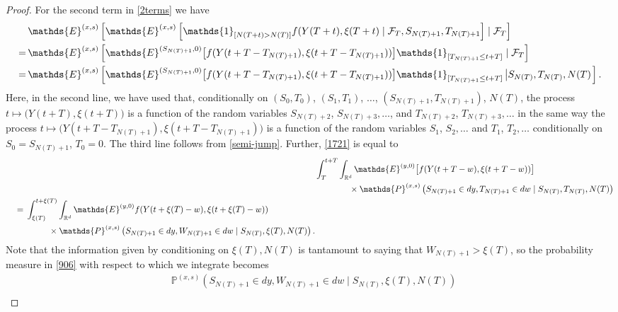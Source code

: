 \documentclass[reqno]{amsart}
\theoremstyle{remark}
\numberwithin{equation}{section} %
\newcommand{\1}{\mathds{1}}
\begin{document}
\begin{proof}
		For the second term in \eqref{2terms} we have
		\begin{align}
			&  \mathds{E}^{(x,s)}\left[\mathds{E}^{(x,s)} \left[ \1_{[N(T+t) > N(T)]}f(Y(T+t), \xi(T+t) \mid \mathcal{F}_T, S_{N(T)+1}, T_{N(T)+1} \right] \mid \mathcal{F}_T \right] \notag \\
			= \, & \mathds{E}^{(x,s)} \left[ \mathds{E}^{(S_{N(T)+1},0)} \big[f(Y( t+T-T_{N(T)+1}), \xi(t+T-T_{N(T)+1}))\big] \mathds{1}_{[T_{N(T)+1}\leq t+T]} \mid \mathcal{F}_T \right]\notag \\
			= \, & \mathds{E}^{(x,s)} \left[ \mathds{E}^{(S_{N(T)+1},0)} \big[f(Y( t+T-T_{N(T)+1}), \xi(t+T-T_{N(T)+1}))\big] \mathds{1}_{[T_{N(T)+1}\leq t+T]} \left|S_{N(T)}, T_{N(T)} , N(T)\right. \right].
			\label{1721}
		\end{align}
		Here, in the second line, we have used that, conditionally on $(S_0, T_0)$, $(S_1,T_1)$, $\dots$, $(S_{N(T)+1}, T_{N(T)+1})$, $N(T)$, the process $t\mapsto \big(Y(t+T), \xi (t+T)\big)$ is a function of the random variables $S_{N(T)+2}$, $S_{N(T)+3},\dots$, and $T_{N(T)+2}$, $T_{N(T)+3}, \dots$ in the same way the process $t\mapsto \big(Y(t+T-T_{N(T)+1}),\xi(t+T-T_{N(T)+1})\big)$ is a function of the random variables $S_1$, $S_2,\dots$ and $T_1$, $T_2,\dots$ conditionally on $S_0=S_{N(T)+1}$, $T_0=0$. The third line follows from \eqref{semi-jump}. Further, \eqref{1721} is equal to
		\begin{align}
			& \int_{T}^{t+T}  \int_{\mathbb{R}^d} \mathds{E}^{(y,0)} \big[f(Y(t+T-w), \xi(t+T-w))\big]\notag \\ & \qquad \qquad \times \mathds{P}^{{(x,s)}} \left( S_{N(T)+1} \in dy, T_{N(T)+1} \in dw \mid S_{N(T)}, T_{N(T)} , N(T) \right) \notag \\
			\begin{split}
				\label{906}
				&\quad = \, \int_{\xi(T)}^{t+\xi(T)}  \int_{\mathbb{R}^d} \mathds{E}^{(y,0)} f(Y(t+\xi(T)-w), \xi(t+\xi(T)-w))\\ &\quad \qquad \qquad \times \mathds{P}^{(x,s)} \left( S_{N(T)+1} \in dy, W_{N(T)+1} \in dw \mid S_{N(T)}, \xi(T),  N(T) \right).
			\end{split}
		\end{align}
		Note that the information given by conditioning on $\xi(T), N(T)$ is tantamount to saying that $W_{N(T)+1}>\xi(T)$, so the probability measure in \eqref{906} with respect to which we integrate becomes
		\begin{align}
			&\mathds{P}^{(x,s)} \left( S_{N(T)+1} \in dy, W_{N(T)+1} \in dw \mid S_{N(T)}, \xi(T),  N(T) \right)\\

\end{align}
\end{proof}
\end{document}
